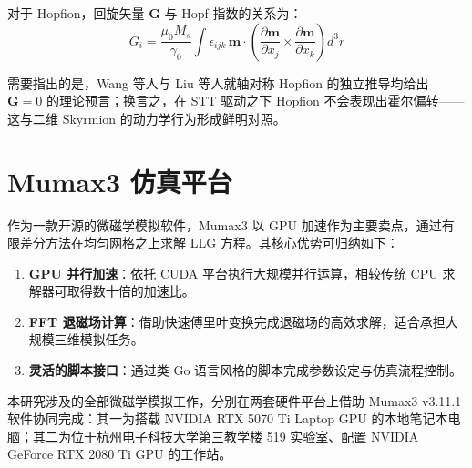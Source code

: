 对于 Hopfion，回旋矢量 $\mathbf{G}$ 与 Hopf 指数的关系为\cite{liu2020three}：
\begin{equation}
  G_i = \frac{\mu_0 M_s}{\gamma_0} \int \epsilon_{ijk} \, \mathbf{m} \cdot \left( \frac{\partial \mathbf{m}}{\partial x_j} \times \frac{\partial \mathbf{m}}{\partial x_k} \right) d^3r
  \label{eq:gyrovector}
\end{equation}

需要指出的是，Wang 等人\cite{wang2019current}与 Liu 等人\cite{liu2020three}就轴对称 Hopfion 的独立推导均给出 $\mathbf{G} = 0$ 的理论预言；换言之，在 STT 驱动之下 Hopfion 不会表现出霍尔偏转——这与二维 Skyrmion 的动力学行为形成鲜明对照。


\section{Mumax3 仿真平台}

作为一款开源的微磁学模拟软件\cite{vansteenkiste2014design}，Mumax3 以 GPU 加速作为主要卖点，通过有限差分方法在均匀网格之上求解 LLG 方程。其核心优势可归纳如下：

\begin{enumerate}[label=(\arabic*)]
  \item \textbf{GPU 并行加速}：依托 CUDA 平台执行大规模并行运算，相较传统 CPU 求解器可取得数十倍的加速比。
  \item \textbf{FFT 退磁场计算}：借助快速傅里叶变换完成退磁场的高效求解，适合承担大规模三维模拟任务。
  \item \textbf{灵活的脚本接口}：通过类 Go 语言风格的脚本完成参数设定与仿真流程控制。
\end{enumerate}

本研究涉及的全部微磁学模拟工作，分别在两套硬件平台上借助 Mumax3 v3.11.1 软件协同完成：其一为搭载 NVIDIA RTX 5070 Ti Laptop GPU 的本地笔记本电脑；其二为位于杭州电子科技大学第三教学楼 519 实验室、配置 NVIDIA GeForce RTX 2080 Ti GPU 的工作站。
